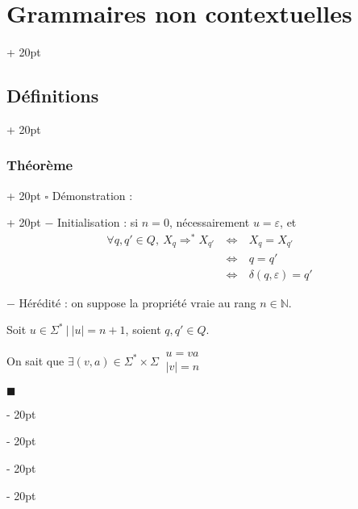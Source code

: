 \documentclass[a4paper, 12pt, twoside]{article}
\newcommand{\N}{\mathbb{N}} %
\newcommand{\abs}[1]{\left\lvert #1 \right\rvert}
\newcommand{\ssi}{\ \Leftrightarrow \ }
\newcommand{\ind}[1][20pt]{\advance\leftskip + #1}
\newcommand{\deind}[1][20pt]{\advance\leftskip - #1}
\newenvironment{indt}[2][20pt]{#2 \par \ind[#1]}{\par \deind} %
\newenvironment{proof}[1][{Démonstration :}]{\begin{indt}{$\square$ #1}}{$\blacksquare$ \end{indt}}
\begin{document}
\begin{indt}{\section{Grammaires non contextuelles}}
\begin{indt}{\subsection{Définitions}}
\begin{indt}{\subsubsection{Théorème}}
\begin{proof}
                    $-$ Initialisation :
                    si $n = 0$, nécessairement $u = \varepsilon$, et
                    \[
                        \begin{array}{rcl}
                            \forall q, q' \in Q,\
                            X_q \Rightarrow^* X_{q'}
                            &\ssi&
                            X_q = X_{q'}
                            \\
                            &\ssi& q = q'
                            \\
                            &\ssi& \delta(q, \varepsilon) = q'
                        \end{array}
                    \]

                    \vspace{6pt}
                    
                    $-$ Hérédité : on suppose la propriété vraie au rang $n \in \N$.

                    Soit $u \in \Sigma^*\ |\ \abs u = n + 1$, soient $q, q' \in Q$.

                    On sait que
                    $
                        \exists (v, a) \in \Sigma^* \times \Sigma\ 
                        \begin{array}{|l}
                            u = va
                            \\
                            \abs v = n
                        \end{array}
                    $


\end{proof}
\end{indt}
\end{indt}
\end{indt}
\end{document}
